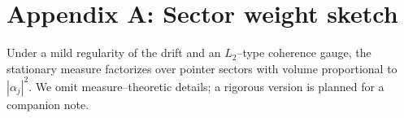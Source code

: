 \documentclass[10pt]{article}
\begin{document}
\section*{Appendix A: Sector weight sketch}
Under a mild regularity of the drift and an $L_2$--type coherence gauge, the stationary measure factorizes over pointer sectors with volume proportional to $|\alpha_j|^2$. We omit measure--theoretic details; a rigorous version is planned for a companion note.
\end{document}

